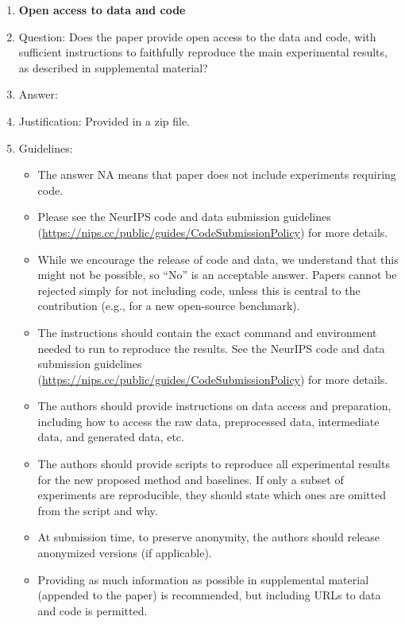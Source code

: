 \documentclass{article}
\theoremstyle{plain}
\theoremstyle{definition}
\theoremstyle{remark}
\theoremstyle{remark}
\begin{document}
\begin{enumerate}
\item {\bf Open access to data and code}
    \item[] Question: Does the paper provide open access to the data and code, with sufficient instructions to faithfully reproduce the main experimental results, as described in supplemental material?
    \item[] Answer: \answerYes{} %
    \item[] Justification: Provided in a zip file.  
    \item[] Guidelines:
    \begin{itemize}
        \item The answer NA means that paper does not include experiments requiring code.
        \item Please see the NeurIPS code and data submission guidelines (\url{https://nips.cc/public/guides/CodeSubmissionPolicy}) for more details.
        \item While we encourage the release of code and data, we understand that this might not be possible, so “No” is an acceptable answer. Papers cannot be rejected simply for not including code, unless this is central to the contribution (e.g., for a new open-source benchmark).
        \item The instructions should contain the exact command and environment needed to run to reproduce the results. See the NeurIPS code and data submission guidelines (\url{https://nips.cc/public/guides/CodeSubmissionPolicy}) for more details.
        \item The authors should provide instructions on data access and preparation, including how to access the raw data, preprocessed data, intermediate data, and generated data, etc.
        \item The authors should provide scripts to reproduce all experimental results for the new proposed method and baselines. If only a subset of experiments are reproducible, they should state which ones are omitted from the script and why.
        \item At submission time, to preserve anonymity, the authors should release anonymized versions (if applicable).
        \item Providing as much information as possible in supplemental material (appended to the paper) is recommended, but including URLs to data and code is permitted.
    \end{itemize}



\end{enumerate}
\end{document}
